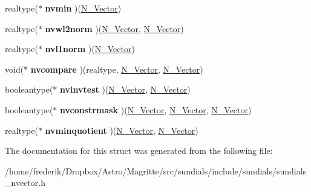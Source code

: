 \begin{DoxyCompactItemize}
realtype($\ast$ {\bfseries nvmin} )(\mbox{\hyperlink{struct__generic__N__Vector}{N\+\_\+\+Vector}})
\item 
\mbox{\label{struct__generic__N__Vector__Ops_a1debd7c1518ac770ef6f26b8efa1024e}} 
realtype($\ast$ {\bfseries nvwl2norm} )(\mbox{\hyperlink{struct__generic__N__Vector}{N\+\_\+\+Vector}}, \mbox{\hyperlink{struct__generic__N__Vector}{N\+\_\+\+Vector}})
\item 
\mbox{\label{struct__generic__N__Vector__Ops_aa570973e00665ce9a019a279e09012d2}} 
realtype($\ast$ {\bfseries nvl1norm} )(\mbox{\hyperlink{struct__generic__N__Vector}{N\+\_\+\+Vector}})
\item 
\mbox{\label{struct__generic__N__Vector__Ops_a83597cdf9ef5f33255d00cb50c89fa46}} 
void($\ast$ {\bfseries nvcompare} )(realtype, \mbox{\hyperlink{struct__generic__N__Vector}{N\+\_\+\+Vector}}, \mbox{\hyperlink{struct__generic__N__Vector}{N\+\_\+\+Vector}})
\item 
\mbox{\label{struct__generic__N__Vector__Ops_ad4c457f79197c4863dc1c2ef02a092f3}} 
booleantype($\ast$ {\bfseries nvinvtest} )(\mbox{\hyperlink{struct__generic__N__Vector}{N\+\_\+\+Vector}}, \mbox{\hyperlink{struct__generic__N__Vector}{N\+\_\+\+Vector}})
\item 
\mbox{\label{struct__generic__N__Vector__Ops_a508c526a469e74104b50ba01268be410}} 
booleantype($\ast$ {\bfseries nvconstrmask} )(\mbox{\hyperlink{struct__generic__N__Vector}{N\+\_\+\+Vector}}, \mbox{\hyperlink{struct__generic__N__Vector}{N\+\_\+\+Vector}}, \mbox{\hyperlink{struct__generic__N__Vector}{N\+\_\+\+Vector}})
\item 
\mbox{\label{struct__generic__N__Vector__Ops_a19f52ebed023e3a5aa140ac6464fca3f}} 
realtype($\ast$ {\bfseries nvminquotient} )(\mbox{\hyperlink{struct__generic__N__Vector}{N\+\_\+\+Vector}}, \mbox{\hyperlink{struct__generic__N__Vector}{N\+\_\+\+Vector}})
\end{DoxyCompactItemize}


The documentation for this struct was generated from the following file\+:\begin{DoxyCompactItemize}
\item 
/home/frederik/\+Dropbox/\+Astro/\+Magritte/src/sundials/include/sundials/sundials\+\_\+nvector.\+h\end{DoxyCompactItemize}
